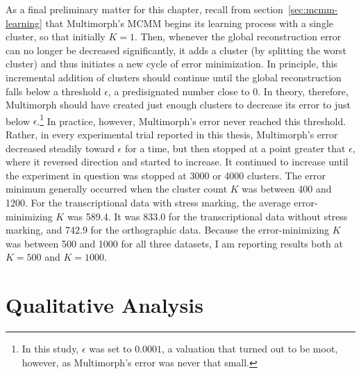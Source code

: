 As a final preliminary matter for this chapter, recall from 
section~\ref{sec:mcmm-learning}
that Multimorph's MCMM begins its learning process with a single cluster, so that initially $K = 1$.
Then, whenever the  
global reconstruction error can no longer be decreased 
significantly, it adds a cluster (by splitting the worst cluster) and thus initiates a new cycle of error minimization.
In principle, this incremental addition 
of clusters
should continue until the global reconstruction falls below a
threshold $\epsilon$, a predisignated number close to $0$.
In theory, therefore, Multimorph should have created just enough clusters to decrease its error to just below $\epsilon$.\footnote{In this study, $\epsilon$ was set to $0.0001$, a valuation that turned out to be moot, however, as Multimorph's error was never that small.}
In practice, however,
 Multimorph's error never reached this threshold.
 Rather, in every experimental trial reported in this thesis, Multimorph's 
 error decreased steadily toward $\epsilon$ for a time, but then stopped at a point greater that $\epsilon$, 
 where it reversed direction and started to increase.  
It continued to increase until the experiment in question was stopped at 3000 or 4000 clusters.  
The error minimum generally occurred when the cluster count $K$ was between 400 and 1200. 
For the transcriptional data with stress marking, the average error-minimizing $K$ was 589.4.
It was
833.0 for the transcriptional data without stress marking,
and 742.9 for the orthographic data. Because the error-minimizing $K$ was between 500 and 1000
for all three datasets, I am reporting results both at $K = 500$ and $K = 1000$.

\section{Qualitative Analysis}
\label{sec:qual}

